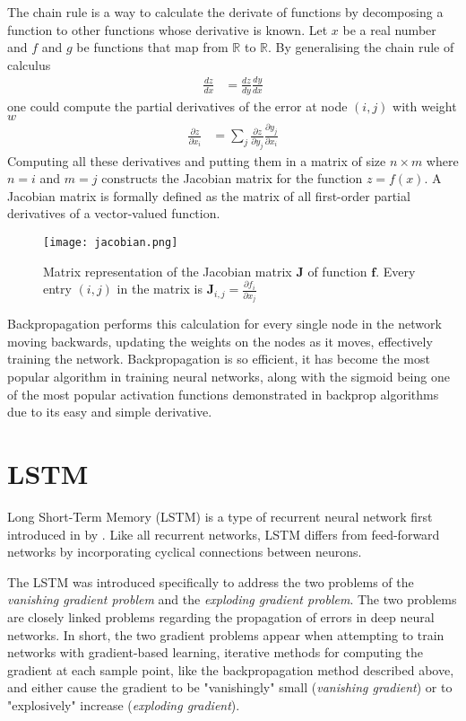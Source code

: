 \newcommand{\R}{\mathbb{R}}

The chain rule is a way to calculate the derivate of functions by decomposing a function to other functions whose derivative is known. Let $x$ be a real number and $f$ and $g$ be functions that map from $\R$ to $\R$. By generalising the chain rule of calculus
\begin{align}
    \frac{dz}{dx} &= \frac{dz}{dy}\frac{dy}{dx}
\end{align}
one could compute the partial derivatives of the error at node $(i, j)$ with weight $w$ 
\begin{align}
    \frac{\partial z}{\partial x_i} &= \sum\limits_{j} \frac{\partial z}{\partial y_j}\frac{\partial y_j}{\partial x_i}
\end{align}
Computing all these derivatives and putting them in a matrix of size $n\times m$ where $n = i$ and $m = j$ constructs the Jacobian matrix for the function $z = f(x)$. A Jacobian matrix is formally defined as the matrix of all first-order partial derivatives of a vector-valued function.
\begin{figure}[H]
    \centering
    \texttt{[image: jacobian.png]}
    \label{tab:jacobian}
    \caption{Matrix representation of the Jacobian matrix $\mathbf{J}$ of function $\mathbf{f}$. Every entry $(i, j)$ in the matrix is $\mathbf{J}_{i, j} = \frac{\partial f_i}{\partial x_j}$}
\end{figure}
Backpropagation performs this calculation for every single node in the network moving backwards, updating the weights on the nodes as it moves, effectively training the network. Backpropagation is so efficient, it has become the most popular algorithm in training neural networks, along with the sigmoid being one of the most popular activation functions demonstrated in backprop algorithms due to its easy and simple derivative.

\section{LSTM}
Long Short-Term Memory (LSTM) is a type of recurrent neural network first introduced in \citeyear{lstm} by \citeauthor{lstm}. Like all recurrent networks, LSTM differs from feed-forward networks by incorporating cyclical connections between neurons.

The LSTM was introduced specifically to address the two problems of the \emph{vanishing gradient problem} and the \emph{exploding gradient problem}. The two problems are closely linked problems regarding the propagation of errors in deep neural networks. In short, the two gradient problems appear when attempting to train networks with gradient-based learning, iterative methods for computing the gradient at each sample point, like the backpropagation method described above, and either cause the gradient to be "vanishingly" small (\emph{vanishing gradient}) or to "explosively" increase (\emph{exploding gradient}).

